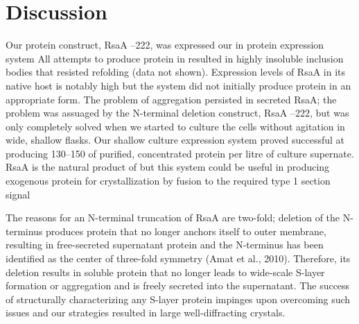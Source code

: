 \section{Discussion}\label{sec:crystal-discussion}
Our protein construct, RsaA --222, was expressed our in \caulobacter protein expression system All attempts to produce protein in \ecoli{} resulted in highly insoluble inclusion bodies that resisted refolding (data not shown). Expression levels of RsaA in its native host is notably high but the system did not initially produce protein in an appropriate form. The problem of aggregation persisted in \caulobacter secreted RsaA; the problem was assuaged by the N-terminal deletion construct, RsaA --222, but was only completely solved when we started to culture the cells without agitation in wide, shallow flasks. Our shallow culture expression system proved successful at producing 130--150 \milligram  of purified, concentrated protein per litre of culture supernate. RsaA is the natural product of \caulobacter but this system could be useful in producing exogenous protein for crystallization by fusion to the required type 1 section signal

The reasons for an N-terminal truncation of RsaA are two-fold; deletion of the
N-terminus produces protein that no longer anchors itself to outer membrane,
resulting in free-secreted supernatant protein and the N-terminus has been
identified as the center of three-fold symmetry (Amat et al., 2010). Therefore,
its deletion results in soluble protein that no longer leads to wide-scale
\ac{S-layer} formation or aggregation and is freely secreted into the
supernatant. The success of structurally characterizing any S-layer protein impinges upon overcoming such issues and our strategies resulted in large well-diffracting crystals.

